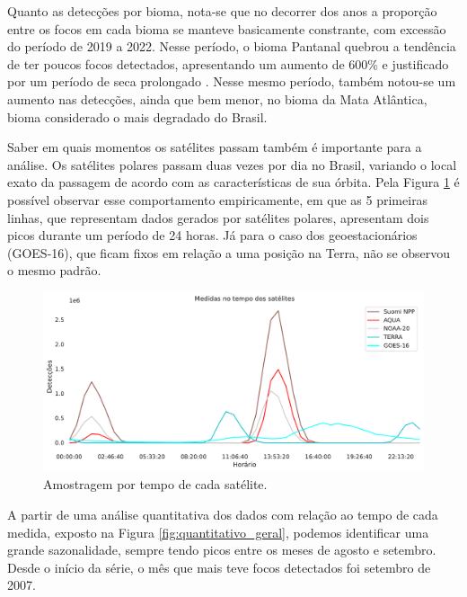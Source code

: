 \documentclass[cic,tc]{iiufrgs}
\begin{document}
Quanto as detecções por bioma, nota-se que no decorrer dos anos a proporção entre os focos em cada bioma se manteve basicamente constrante, com excessão do período de 2019 a 2022. Nesse período, o bioma Pantanal quebrou a tendência de ter poucos focos detectados, apresentando um aumento de 600\% e justificado por um período de seca prolongado \cite{pantanal2021dinamica}. Nesse mesmo período, também notou-se um aumento nas detecções, ainda que bem menor, no bioma da Mata Atlântica, bioma considerado o mais degradado do Brasil. \par

Saber em quais momentos os satélites passam também é importante para a análise. Os satélites polares passam duas vezes por dia no Brasil, variando o local exato da passagem de acordo com as características de sua órbita. Pela Figura \ref{fig:tempo_medidas_satelites} é possível observar esse comportamento empiricamente, em que as 5 primeiras linhas, que representam dados gerados por satélites polares, apresentam dois picos durante um período de 24 horas. Já para o  caso dos geoestacionários (GOES-16), que ficam fixos em relação a uma posição na Terra, não se observou o mesmo padrão. \par

\begin{figure}[H]
    \caption{Amostragem por tempo de cada satélite.}
    \begin{center}
        \includegraphics[width=35em]{tempo_medidas_satelites}
    \end{center}
    \label{fig:tempo_medidas_satelites}
\end{figure}

A partir de uma análise quantitativa dos dados com relação ao tempo de cada medida, exposto na Figura \ref{fig:quantitativo_geral}, podemos identificar uma grande sazonalidade, sempre tendo picos entre os meses de agosto e setembro. Desde o início da série, o mês que mais teve focos detectados foi setembro de 2007. 
\end{document}
